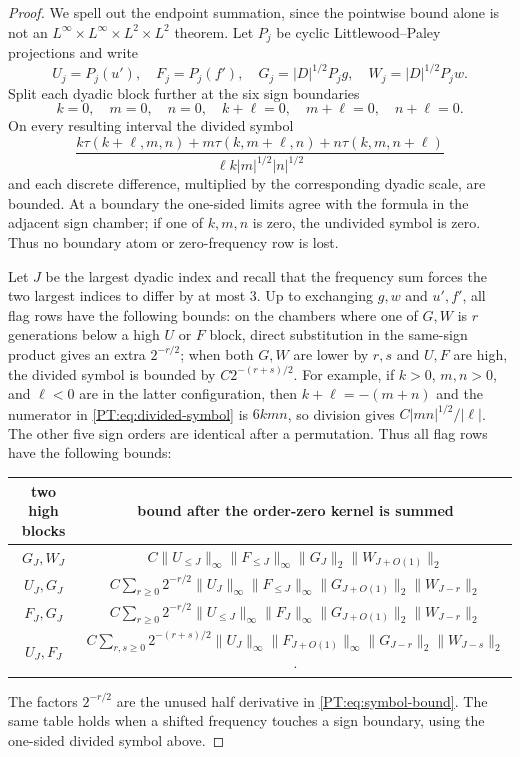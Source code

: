 \begin{proof}
We spell out the endpoint summation, since the pointwise bound alone is
not an $L^\infty\times L^\infty\times L^2\times L^2$ theorem.  Let
$P_j$ be cyclic Littlewood--Paley projections and write
\[
 U_j=P_j(u'),\quad F_j=P_j(f'),\quad
 G_j=|D|^{1/2}P_jg,\quad W_j=|D|^{1/2}P_jw.
\]
Split each dyadic block further at the six sign boundaries
\[
 k=0,\quad m=0,\quad n=0,\quad
 k+\ell=0,\quad m+\ell=0,\quad n+\ell=0.
\]
On every resulting interval the divided symbol
\begin{equation}\label{PT:eq:divided-symbol}
 \frac{k\tau(k+\ell,m,n)+m\tau(k,m+\ell,n)
       +n\tau(k,m,n+\ell)}
      {\ell k|m|^{1/2}|n|^{1/2}}
\end{equation}
and each discrete difference, multiplied by the corresponding dyadic
scale, are bounded.  At a boundary the one-sided limits agree with the
formula in the adjacent sign chamber; if one of $k,m,n$ is zero, the
undivided symbol is zero.  Thus no boundary atom or zero-frequency row is
lost.

Let $J$ be the largest dyadic index and recall that the frequency sum
forces the two largest indices to differ by at most $3$.  Up to exchanging
$g,w$ and $u',f'$, all flag rows have the following bounds:
on the chambers where one of $G,W$ is $r$ generations below a high
$U$ or $F$ block, direct substitution in the same-sign product gives an
extra $2^{-r/2}$; when both $G,W$ are lower by $r,s$ and $U,F$ are high,
the divided symbol is bounded by $C2^{-(r+s)/2}$.  For example, if
$k>0$, $m,n>0$, and $\ell<0$ are in the latter configuration, then
$k+\ell=-(m+n)$ and the numerator in
\eqref{PT:eq:divided-symbol} is $6kmn$, so division gives
$C|mn|^{1/2}/|\ell|$.  The other five sign orders are identical after a
permutation.  Thus all flag rows have the following bounds:
\begin{center}
\begin{tabular}{c|c}
two high blocks & bound after the order-zero kernel is summed\\
\hline
$G_J,W_J$ &
$C\|U_{\le J}\|_\infty\|F_{\le J}\|_\infty
  \|G_J\|_2\|W_{J+O(1)}\|_2$\\
$U_J,G_J$ &
$C\sum_{r\ge0}2^{-r/2}\|U_J\|_\infty
  \|F_{\le J}\|_\infty\|G_{J+O(1)}\|_2\|W_{J-r}\|_2$\\
$F_J,G_J$ &
$C\sum_{r\ge0}2^{-r/2}\|U_{\le J}\|_\infty
  \|F_J\|_\infty\|G_{J+O(1)}\|_2\|W_{J-r}\|_2$\\
$U_J,F_J$ &
$C\sum_{r,s\ge0}2^{-(r+s)/2}\|U_J\|_\infty
  \|F_{J+O(1)}\|_\infty\|G_{J-r}\|_2\|W_{J-s}\|_2$.
\end{tabular}
\end{center}
The factors $2^{-r/2}$ are the unused half derivative in
\eqref{PT:eq:symbol-bound}.  The same table holds when a shifted frequency
touches a sign boundary, using the one-sided divided symbol above.


\end{proof}
